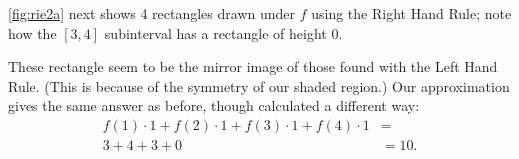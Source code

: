 \begin{example}
\autoref{fig:rie2a} next shows 4 rectangles drawn under $f$ using the Right Hand Rule; note how the $[3,4]$ subinterval has a rectangle of height 0. 


These rectangle seem to be the mirror image of those found with the Left Hand Rule. (This is because of the symmetry of our shaded region.) Our approximation gives the same answer as before, though calculated a different way:
\begin{align*}
 f(1)\cdot 1 + f(2)\cdot 1+ f(3)\cdot 1+f(4)\cdot 1 &=\\
	3+4+3+0&= 10.
\end{align*}


\end{example}
